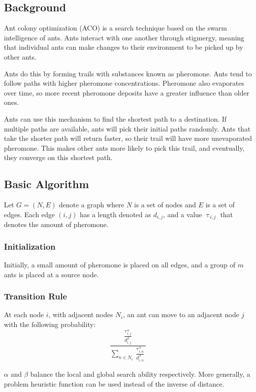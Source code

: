 \documentclass[12pt,titlepage]{article}
\begin{document}
    \subsection{Background}
      Ant colony optimization (ACO) is a search technique based on the swarm intelligence of ants. Ants interact with one another through stigmergy, meaning
      that individual ants can make changes to their environment to be picked up by other ants.
      
      Ants do this by forming trails with substances known as pheromone. Ants tend to follow paths with higher pheromone concentrations.
      Pheromone also evaporates over time, so more recent pheromone deposits have a greater influence than older ones.
      
      Ants can use this mechanism to find the shortest path to a destination. If multiple paths are available, ants will pick their initial paths randomly.
      Ants that take the shorter path will return faster, so their trail will have more unevaporated pheromone. This makes other ants more likely to pick
      this trail, and eventually, they converge on this shortest path.

    \subsection{Basic Algorithm}
      Let $G = (N,E)$ denote a graph where $N$ is a set of nodes and $E$ is a set of edges. Each edge $(i,j)$ has a length denoted as $d_{i,j}$, and a
      value $\uptau_{i,j}$ that denotes the amount of pheromone.

      \subsubsection{Initialization}
        Initially, a small amount of pheromone is placed on all edges, and a group of $m$ ants is placed at a source node.

      \subsubsection{Transition Rule}
        At each node $i$, with adjacent nodes $N_i$, an ant can move to an adjacent node $j$ with the following probability:
        $$\frac{\frac{\uptau_{i,j}^\alpha}{d_{i,j}^\beta}}{\sum_{n \in N_i} \frac{\uptau_{i,n}^\alpha}{d_{i,n}^\beta}}$$

        $\alpha$ and $\beta$ balance the local and global search ability respectively. More generally, a problem heuristic function can be used instead of the
        inverse of distance.
\end{document}
